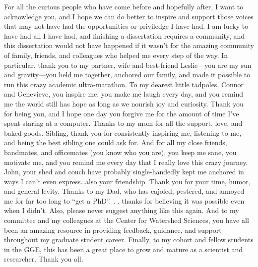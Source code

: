 \documentclass[twoside,12pt,final]{ucthesis-CA2012} %
\begin{document}
\begin{ucfrontmatter}
\begin{dedication}
\begin{center}
\begin{Large}
      \end{Large}
      \end{center}
  \end{dedication}
  \begin{acknowledgements}
    For all the curious people who have come before and hopefully after, I
    want to acknowledge you, and I hope we can do better to inspire and
    support those voices that may not have had the opportunities or
    priviledge I have had. I am lucky to have had all I have had, and
    finishing a dissertation requires a community, and this dissertation
    would not have happened if it wasn't for the amazing community of
    family, friends, and colleagues who helped me every step of the way. In
    particular, thank you to my partner, wife and best-friend Leslie---you
    are my sun and gravity---you held me together, anchored our family, and
    made it possible to run this crazy academic ultra-marathon. To my
    dearest little tadpoles, Connor and Genevieve, you inspire me, you make
    me laugh every day, and you remind me the world still has hope as long
    as we nourish joy and curiosity. Thank you for being you, and I hope one
    day you forgive me for the amount of time I've spent staring at a
    computer. Thanks to my mom for all the support, love, and baked goods.
    Sibling, thank you for consistently inspiring me, listening to me, and
    being the best sibling one could ask for. And for all my close friends,
    bandmates, and officemates (you know who you are), you keep me sane, you
    motivate me, and you remind me every day that I really love this crazy
    journey. John, your shed and couch have probably single-handedly kept me
    anchored in ways I can't even express\ldots{}also your friendship. Thank
    you for your time, humor, and general levity. Thanks to my Dad, who has
    cajoled, pestered, and annoyed me for far too long to ``get a PhD''. . .
    thanks for believing it was possible even when I didn't. Also, please
    never suggest anything like this again. And to my committee and my
    colleagues at the Center for Watershed Sciences, you have all been an
    amazing resource in providing feedback, guidance, and support throughout
    my graduate student career. Finally, to my cohort and fellow students in
    the GGE, this has been a great place to grow and mature as a scientist
    and researcher. Thank you all.
  \end{acknowledgements}


\end{ucfrontmatter}
\end{document}
